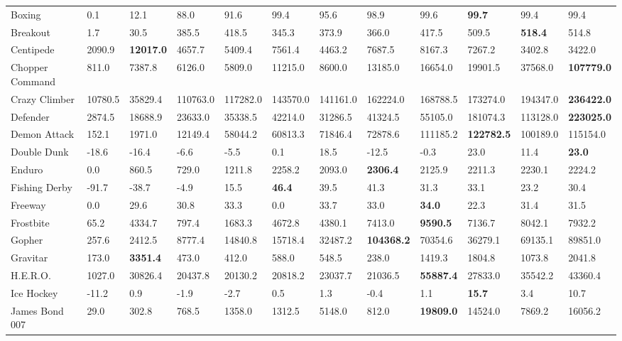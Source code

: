 \documentclass{article}
\begin{document}
\begin{table}[h]
\begin{scriptsize}
\begin{sc}
\begin{tabular}{| p{2.4cm} p{0.84cm} p{0.84cm} p{0.84cm} p{0.84cm} p{0.84cm} p{0.84cm} p{0.84cm} p{0.84cm} p{0.84cm} p{0.84cm} p{0.84cm} |}
Boxing & 0.1 & 12.1 & 88.0 & 91.6 & 99.4 & 95.6 & 98.9 & 99.6 & {\bf 99.7} & 99.4 & 99.4\\
Breakout & 1.7 & 30.5 & 385.5 & 418.5 & 345.3 & 373.9 & 366.0 & 417.5 & 509.5 & {\bf 518.4} & 514.8\\
Centipede & 2090.9 & {\bf 12017.0} & 4657.7 & 5409.4 & 7561.4 & 4463.2 & 7687.5 & 8167.3 & 7267.2 & 3402.8 & 3422.0\\
Chopper Command & 811.0 & 7387.8 & 6126.0 & 5809.0 & 11215.0 & 8600.0 & 13185.0 & 16654.0 & 19901.5 & 37568.0 & {\bf 107779.0}\\
Crazy Climber & 10780.5 & 35829.4 & 110763.0 & 117282.0 & 143570.0 & 141161.0 & 162224.0 & 168788.5 & 173274.0 & 194347.0 & {\bf 236422.0}\\
Defender & 2874.5 & 18688.9 & 23633.0 & 35338.5 & 42214.0 & 31286.5 & 41324.5 & 55105.0 & 181074.3 & 113128.0 & {\bf 223025.0}\\
Demon Attack & 152.1 & 1971.0 & 12149.4 & 58044.2 & 60813.3 & 71846.4 & 72878.6 & 111185.2 & {\bf 122782.5} & 100189.0 & 115154.0\\
Double Dunk & -18.6 & -16.4 & -6.6 & -5.5 & 0.1 & 18.5 & -12.5 & -0.3 & 23.0 & 11.4 & {\bf 23.0}\\
Enduro & 0.0 & 860.5 & 729.0 & 1211.8 & 2258.2 & 2093.0 & {\bf 2306.4} & 2125.9 & 2211.3 & 2230.1 & 2224.2\\
Fishing Derby & -91.7 & -38.7 & -4.9 & 15.5 & {\bf 46.4} & 39.5 & 41.3 & 31.3 & 33.1 & 23.2 & 30.4\\
Freeway & 0.0 & 29.6 & 30.8 & 33.3 & 0.0 & 33.7 & 33.0 & {\bf 34.0} & 22.3 & 31.4 & 31.5\\
Frostbite & 65.2 & 4334.7 & 797.4 & 1683.3 & 4672.8 & 4380.1 & 7413.0 & {\bf 9590.5} & 7136.7 & 8042.1 & 7932.2\\
Gopher & 257.6 & 2412.5 & 8777.4 & 14840.8 & 15718.4 & 32487.2 & {\bf 104368.2} & 70354.6 & 36279.1 & 69135.1 & 89851.0\\
Gravitar & 173.0 & {\bf 3351.4} & 473.0 & 412.0 & 588.0 & 548.5 & 238.0 & 1419.3 & 1804.8 & 1073.8 & 2041.8\\
H.E.R.O. & 1027.0 & 30826.4 & 20437.8 & 20130.2 & 20818.2 & 23037.7 & 21036.5 & {\bf 55887.4} & 27833.0 & 35542.2 & 43360.4\\
Ice Hockey & -11.2 & 0.9 & -1.9 & -2.7 & 0.5 & 1.3 & -0.4 & 1.1 & {\bf 15.7} & 3.4 & 10.7\\
James Bond 007 & 29.0 & 302.8 & 768.5 & 1358.0 & 1312.5 & 5148.0 & 812.0 & {\bf 19809.0} & 14524.0 & 7869.2 & 16056.2\\

\end{tabular}
\end{sc}
\end{scriptsize}
\end{table}
\end{document}
